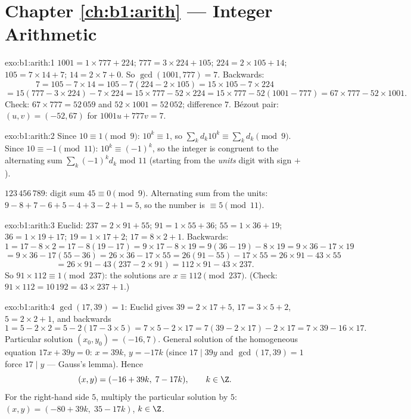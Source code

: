 \section*{Chapter \ref{ch:b1:arith} --- Integer Arithmetic}

\begin{solution}{exo:b1:arith:1}
$1001 = 1 \times 777 + 224$; $777 = 3 \times 224 + 105$; $224 = 2
\times 105 + 14$; $105 = 7 \times 14 + 7$; $14 = 2 \times 7 + 0$. So
$\gcd(1001, 777) = 7$. Backwards:
\[
7 = 105 - 7 \times 14
= 105 - 7(224 - 2\times 105) = 15 \times 105 - 7 \times 224
\]
\[
= 15(777 - 3\times 224) - 7\times 224 = 15 \times 777 - 52 \times 224
= 15 \times 777 - 52(1001 - 777) = 67 \times 777 - 52 \times 1001 .
\]
Check: $67 \times 777 = 52\,059$ and $52 \times 1001 = 52\,052$;
difference $7$. Bézout pair: $(u, v) = (-52, 67)$ for $1001u + 777v =
7$.
\end{solution}

\begin{solution}{exo:b1:arith:2}
Since $10 \equiv 1 \pmod 9$: $10^k \equiv 1$, so $\sum_k d_k 10^k
\equiv \sum_k d_k \pmod 9$. Since $10 \equiv -1 \pmod{11}$: $10^k
\equiv (-1)^k$, so the integer is congruent to the alternating sum
$\sum_k (-1)^k d_k$ mod $11$ (starting from the \emph{units} digit
with sign $+$).

$123\,456\,789$: digit sum $45 \equiv 0 \pmod 9$. Alternating sum from
the units: $9 - 8 + 7 - 6 + 5 - 4 + 3 - 2 + 1 = 5$, so the number is
$\equiv 5 \pmod{11}$.
\end{solution}

\begin{solution}{exo:b1:arith:3}
Euclid: $237 = 2 \times 91 + 55$; $91 = 1 \times 55 + 36$; $55 = 1
\times 36 + 19$; $36 = 1 \times 19 + 17$; $19 = 1 \times 17 + 2$; $17
= 8 \times 2 + 1$. Backwards:
\[
1 = 17 - 8\times 2 = 17 - 8(19 - 17) = 9\times 17 - 8\times 19
= 9(36 - 19) - 8\times 19 = 9\times 36 - 17\times 19
\]
\[
= 9\times 36 - 17(55 - 36) = 26\times 36 - 17\times 55
= 26(91 - 55) - 17\times 55 = 26\times 91 - 43\times 55
\]
\[
= 26\times 91 - 43(237 - 2\times 91) = 112 \times 91 - 43 \times 237.
\]
So $91 \times 112 \equiv 1 \pmod{237}$: the solutions are $x \equiv
112 \pmod{237}$. (Check: $91 \times 112 = 10\,192 = 43 \times 237 +
1$.)
\end{solution}

\begin{solution}{exo:b1:arith:4}
$\gcd(17, 39) = 1$: Euclid gives $39 = 2\times 17 + 5$, $17 = 3\times
5 + 2$, $5 = 2\times 2 + 1$, and backwards
\[
1 = 5 - 2\times 2 = 5 - 2(17 - 3\times 5) = 7\times 5 - 2\times 17
= 7(39 - 2\times 17) - 2\times 17 = 7\times 39 - 16\times 17 .
\]
Particular solution $(x_0, y_0) = (-16, 7)$. General solution of the
homogeneous equation $17x + 39y = 0$: $x = 39k$, $y = -17k$ (since
$17 \mid 39y$ and $\gcd(17,39) = 1$ force $17 \mid y$ ---
Gauss's lemma). Hence
\[
(x, y) = (-16 + 39k,\; 7 - 17k), \qquad k \in \Z .
\]
For the right-hand side $5$, multiply the particular solution by $5$:
$(x, y) = (-80 + 39k,\; 35 - 17k)$, $k \in \Z$.
\end{solution}

